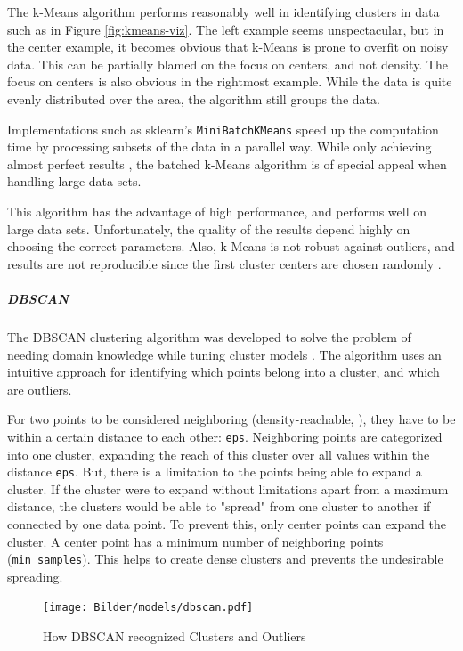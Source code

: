 		The k-Means algorithm performs reasonably well in identifying clusters in data such as in Figure \ref{fig:kmeans-viz}. The left example seems unspectacular, but in the center example, it becomes obvious that k-Means is prone to overfit on noisy data. This can be partially blamed on the focus on centers, and not density. The focus on centers is also obvious in the rightmost example. While the data is quite evenly distributed over the area, the algorithm still groups the data. 
		
		Implementations such as \ac{sklearn}'s \lstinline|MiniBatchKMeans| \cite{sklearn} speed up the computation time by processing subsets of the data in a parallel way. While only achieving almost perfect results \cite{sculleyWebscaleKmeansClustering2010}, the batched k-Means algorithm is of special appeal when handling large data sets.
		
		This algorithm has the advantage of high performance, and performs well on large data sets. Unfortunately, the quality of the results depend highly on choosing the correct parameters. Also, k-Means is not robust against outliers, and results are not reproducible since the first cluster centers are chosen randomly \cite[c.6.2]{40algorithms}.
		
		\subparagraph{\acl{DBSCAN}}
		The \ac{DBSCAN} clustering algorithm was developed to solve the problem of needing domain knowledge while tuning cluster models \cite{DBSCAN}. The algorithm uses an intuitive approach for identifying which points belong into a cluster, and which are outliers.

		For two points to be considered neighboring (density-reachable, \cite{DBSCAN}), they have to be within a certain distance to each other: \lstinline|eps|. Neighboring points are categorized into one cluster, expanding the reach of this cluster over all values within the distance \lstinline|eps|.
		But, there is a limitation to the points being able to expand a cluster. If the cluster were to expand without limitations apart from a maximum distance, the clusters would be able to "spread" from one cluster to another if connected by one data point.
		To prevent this, only center points can expand the cluster. A center point has a minimum number of neighboring points (\lstinline|min_samples|). This helps to create dense clusters and prevents the undesirable spreading.
		
		 \begin{figure}[!h]
			\centering
			\texttt{[image: Bilder/models/dbscan.pdf]}
			\caption[How DBSCAN recognized Clusters and Outliers]{How DBSCAN recognized Clusters and Outliers \cite{sklearn}}
			\label{fig:dbscan-viz}
		\end{figure}
	
